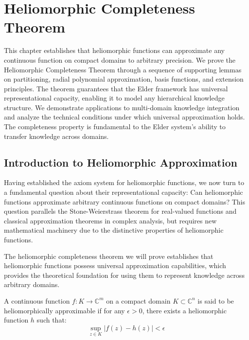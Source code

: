 \chapter{Heliomorphic Completeness Theorem}

\begin{tcolorbox}[colback=DarkSkyBlue!5!white,colframe=DarkSkyBlue!75!black,title=Chapter Summary]
This chapter establishes that heliomorphic functions can approximate any continuous function on compact domains to arbitrary precision. We prove the Heliomorphic Completeness Theorem through a sequence of supporting lemmas on partitioning, radial polynomial approximation, basis functions, and extension principles. The theorem guarantees that the Elder framework has universal representational capacity, enabling it to model any hierarchical knowledge structure. We demonstrate applications to multi-domain knowledge integration and analyze the technical conditions under which universal approximation holds. The completeness property is fundamental to the Elder system's ability to transfer knowledge across domains.
\end{tcolorbox}

\section{Introduction to Heliomorphic Approximation}

Having established the axiom system for heliomorphic functions, we now turn to a fundamental question about their representational capacity: Can heliomorphic functions approximate arbitrary continuous functions on compact domains? This question parallels the Stone-Weierstrass theorem for real-valued functions and classical approximation theorems in complex analysis, but requires new mathematical machinery due to the distinctive properties of heliomorphic functions.

The heliomorphic completeness theorem we will prove establishes that heliomorphic functions possess universal approximation capabilities, which provides the theoretical foundation for using them to represent knowledge across arbitrary domains.

\begin{definition}
A continuous function $f: K \rightarrow \mathbb{C}^m$ on a compact domain $K \subset \mathbb{C}^n$ is said to be heliomorphically approximable if for any $\epsilon > 0$, there exists a heliomorphic function $h$ such that:
\begin{equation}
\sup_{z \in K} |f(z) - h(z)| < \epsilon
\end{equation}
\end{definition}

